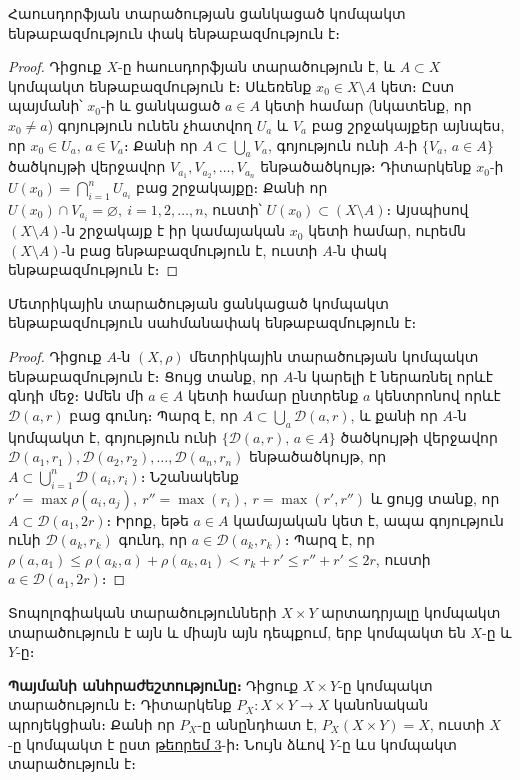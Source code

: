 \documentclass[./main.tex]{subfiles}
\begin{document}
\begin{theorem}\label{ch16thm5} \label{թեորեմ 5}
Հաուսդորֆյան տարածության ցանկացած կոմպակտ են\-թա\-բազ\-մու\-թյուն փակ ենթաբազմություն է։
\end{theorem} %
\begin{proof}
Դիցուք $X$-ը հաուսդորֆյան տարածություն է, և $A\subset X$ կոմպակտ ենթաբազմություն է։ Սևեռենք $x_0 \in X\setminus A$ կետ։ Ըստ պայմանի՝ $x_0$-ի և ցանկա\-ցած $a\in A$ կետի համար (նկատենք, որ $x_0\neq a$) գոյություն ունեն չհատվող $U_a$ և $V_a$ բաց շրջակայքեր այնպես, որ $x_0 \in U_a,\, a \in V_a$։ Քանի որ $A\subset \bigcup\limits_a V_a$, գոյություն ունի $A$-ի $\{V_a,\, a\in A\}$ ծածկույթի վերջավոր $V_{a_1},V_{a_2},\dots,V_{a_n}$ ենթածածկույթ։ Դիտարկենք $x_0\textrm{-ի}$ ${U(x_0)=\bigcap\limits_{i=1}^nU_{a_i}}$  բաց շրջակայքը։ Քանի որ $U(x_0)\cap V_{a_i}=\varnothing, \ i=1,2,\dots,n$, ուստի՝ $U(x_0)\subset (X\setminus A)$։ Այսպիսով $(X\setminus A)$-ն շրջակայք է իր կամայական $x_0$ կետի համար, ուրեմն $(X\setminus A)$-ն բաց ենթաբազմություն է, ուստի $A$-ն փակ ենթաբազմություն է։
\end{proof}

\begin{theorem}\label{ch16thm6}\label{թեորեմ 6}
Մետրիկային տարածության ցանկացած կոմպակտ ենթաբազմու\-թյուն սահմանափակ ենթաբազմու\-թյուն է։
\end{theorem} %

\begin{proof}
Դիցուք $A$-ն $(X,\rho)$ մետրիկային տարածության կոմպակտ են\-թա\-բազ\-մու\-թյուն է։ Ցույց տանք, որ $A$-ն կարելի է ներառնել որևէ գնդի մեջ։ Ամեն մի ${a\in A}$ կետի համար ընտրենք $a$ կենտրոնով որևէ $\mathcal{D}(a,r)$ բաց գունդ։ Պարզ է, որ ${A\subset \bigcup\limits_a \mathcal{D}(a,r)}$, և քանի որ $A$-ն կոմպակտ է, գոյություն ունի ${\{\mathcal{D}(a,r),\, a\in A\} }$ ծած\-կույթի վերջավոր $\mathcal{D} (a_1,r_1), \mathcal{D}(a_2,r_2 ),\dots,\mathcal{D}(a_n,r_n)$ ենթածածկույթ, որ $A\subset {\bigcup\limits_{i=1}^n \mathcal{D}(a_i,r_i)}$։ Նշանակենք $r'=\max \rho(a_i,a_j),\ r''=\max(r_i),\ r=\max(r',r'')$ և ցույց տանք, որ $A\subset \mathcal{D}(a_1,2r)$։ Իրոք, եթե $a\in A$ կամայական կետ է, ապա գոյություն ունի $\mathcal{D}(a_k,r_k )$ գունդ, որ $a\in \mathcal{D}(a_k,r_k)$։ Պարզ է, որ $\rho(a,a_1)\leq \rho(a_k,a)+\rho(a_k,a_1)<r_k+r' \leq r''+r'\leq 2r $, ուստի $a\in \mathcal{D}(a_1,2r)$։
\end{proof}
\begin{theorem}\label{ch16thm7}
Տոպոլոգիական տարածությունների $X\times Y$ արտադրյալը կոմպակտ տարածություն է այն և միայն այն դեպքում, երբ կոմպակտ են $X$-ը և $Y$-ը։
\end{theorem}%
\label{թեորեմ 7}
\textbf{Պայմանի անհրաժեշտությունը։} Դիցուք ${X\times Y}$-ը կոմպակտ տարածություն է։ Դիտարկենք ${P_X:X\times Y\rightarrow X}$ կանոնական պրոյեկցիան։ Քանի որ $P_X$-ը անընդհատ է, ${P_X (X\times Y)=X}$, ուստի $X$-ը կոմպակտ է ըստ \hyperref[թեորեմ 3]{թեորեմ 3}-ի։ Նույն ձևով $Y$-ը ևս կոմպակտ տարածություն է։
\end{document}
